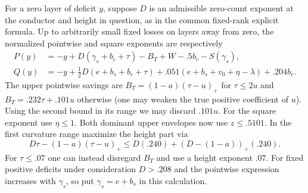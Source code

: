 \documentclass[11pt,a4paper]{article}
\theoremstyle{paperplain}
\numberwithin{equation}{section}
\begin{document}
For a zero layer of deficit $y$, suppose $D$ is an admissible
zero-count exponent at the conductor and height in question,
as in the common fixed-rank explicit formula. Up to arbitrarily
small fixed losses on layers away from zero, the normalized
pointwise and square exponents are respectively
\begin{align}
 P(y)&=-y+D(\gamma_s+b_c+\tau)-B_T+W-.5b_c-S(\gamma_s),
   \label{six:sixmask-point}\\
 Q(y)&=-y+\tfrac12D(e+b_s+b_c+\tau)
       +.051(e+b_s+v_0+\eta-\lambda)+.204b_c.
 \label{six:sixmask-square}
\end{align}
The upper pointwise savings are $B_T=(1-a)(\tau-u)_+$ for
$\tau\le2u$ and $B_T=.232\tau+.101u$ otherwise (one may
weaken the true positive coefficient of $u$). Using the second
bound in its range we may discard $.101u$. For the square
exponent use $\eta\le1$. Both dominant upper envelopes now
use $z\le .5101$. In the first curvature range maximize the
height part via
\[
 D\tau-(1-a)(\tau-u)_+\le D(.240)+
                    (D-(1-a))_+(.240).
\]
For $\tau\le.07$ one can instead disregard $B_T$ and use a
height exponent $.07$. For fixed positive deficits under
consideration $D>.208$ and the pointwise expression increases
with $\gamma_s$, so put $\gamma_s=e+b_s$ in this calculation.
\end{document}
